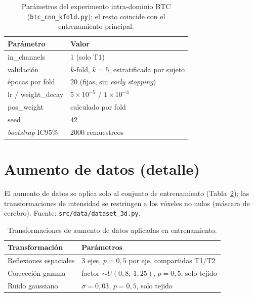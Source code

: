 \begin{table}[ht]
  \centering
  \caption[Configuración del experimento intra-dominio BTC]{Parámetros del
  experimento intra-dominio BTC (\texttt{btc\_cnn\_kfold.py}); el resto coincide
  con el entrenamiento principal.}
  \label{tab:apx_btc}
  \begin{tabular}{l l}
    \hline
    \textbf{Parámetro} & \textbf{Valor} \\
    \hline
    in\_channels            & 1 (solo T1) \\
    validación              & $k$-fold, $k=5$, estratificada por sujeto \\
    épocas por fold         & 20 (fijas, sin \emph{early stopping}) \\
    lr / weight\_decay      & $5\times10^{-5}$ / $1\times10^{-3}$ \\
    pos\_weight             & calculado por fold \\
    seed                    & 42 \\
    \emph{bootstrap} IC95\%  & 2000 remuestreos \\
    \hline
  \end{tabular}
\end{table}

\section{Aumento de datos (detalle)}

El aumento de datos se aplica solo al conjunto de entrenamiento
(Tabla~\ref{tab:apx_aug}); las transformaciones de intensidad se restringen a los
vóxeles no nulos (máscara de cerebro). Fuente: \texttt{src/data/dataset\_3d.py}.

\begin{table}[ht]
  \centering
  \caption[Transformaciones de aumento de datos]{Transformaciones de aumento de
  datos aplicadas en entrenamiento.}
  \label{tab:apx_aug}
  \begin{tabular}{l l}
    \hline
    \textbf{Transformación} & \textbf{Parámetros} \\
    \hline
    Reflexiones espaciales & 3 ejes, $p=0,5$ por eje, compartidas T1/T2 \\
    Corrección gamma       & factor $\sim U(0,8;\ 1,25)$, $p=0,5$, solo tejido \\
    Ruido gaussiano        & $\sigma = 0,03$, $p=0,5$, solo tejido \\
    \hline
  \end{tabular}
\end{table}


